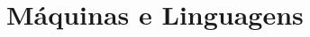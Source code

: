 \documentclass[b5paper,10pt]{book}
\begin{document}
	\part{Máquinas e Linguagens}
	
	

\end{document}
